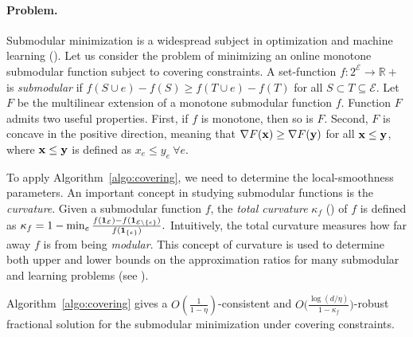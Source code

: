 \paragraph{Problem.}
Submodular minimization is a widespread subject in optimization and machine learning (\cite{IwataFleischer01:A-combinatorial-strongly,Bachothers13:Learning-with,Bach16:Submodular-functions:,BalkanskiSinger:2020}). Let us consider the problem of minimizing an online monotone submodular function subject to covering constraints.
A set-function $f: 2^{\mathcal{E}} \rightarrow \mathbb{R}+$ is \emph{submodular} if
$f(S \cup e) - f(S) \geq f(T \cup e) - f(T)$ for all $S \subset T \subseteq \mathcal{E}$.
Let $F$ be the multilinear extension of a monotone submodular function $f$. Function $F$
admits two useful properties. First, if $f$ is monotone, then so is $F$. Second, $F$ is concave in
the positive direction, meaning that $\nabla F(\mathbf{x}) \geq \nabla F(\mathbf{y})$ for all $\mathbf{x} \leq \mathbf{y}$, where $\mathbf{x} \leq \mathbf{y}$ is defined as $x_{e} \leq y_{e} ~\forall e$.

To apply Algorithm~\ref{algo:covering}, we need to determine the local-smoothness parameters.
An important concept in studying submodular functions is the \emph{curvature}. Given a submodular
function $f$, the \emph{total curvature} $\kappa_{f}$ (\cite{ConfortiCornuejols84:Submodular-set-functions}) of $f$ is defined as
$
\kappa_{f} = 1 - \min_{e} \frac{f(\mathbf{1}_{\mathcal{E}}) - f(\mathbf{1}_{\mathcal{E} \setminus \{e\}})}{f(\mathbf{1}_{\{e\}})}.
$
Intuitively, the total curvature measures how far away $f$ is from being \emph{modular}. This concept of
curvature is used to determine both upper and lower bounds on the approximation ratios
for many submodular and learning problems (see \cite{ConfortiCornuejols84:Submodular-set-functions,GoemansHarvey09:Approximating-submodular,BalcanHarvey12:Learning-Submodular,Vondrak10:Submodularity-and-Curvature:,IyerJegelka13:Curvature-and-optimal,SviridenkoVondrak17:Optimal-approximation}).

\begin{proposition}
Algorithm~\ref{algo:covering} gives a
$O(\frac{1}{1 - \eta})$-consistent and $O\bigl( \frac{\log (d/\eta)}{1 - \kappa_{f}} \bigr)$-robust fractional  solution
for the submodular minimization under covering constraints.
\end{proposition}

